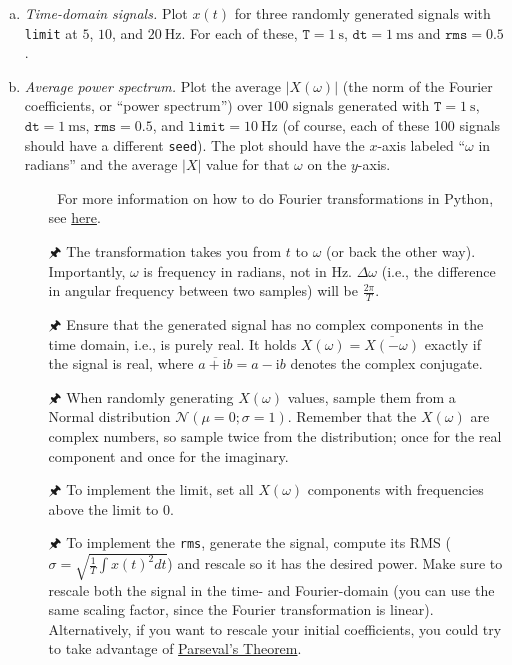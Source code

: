 	\begin{enumerate}[a)]
		\item {} \textit{Time-domain signals.} Plot $x(t)$ for three randomly generated signals with \texttt{limit} at $5$, $10$, and $\SI{20}{\hertz}$. For each of these, $\mathtt{T}=\SI{1}{\second}$, $\mathtt{dt}=\SI{1}{\milli\second}$ and $\mathtt{rms}=0.5$.
		\item {} \textit{Average power spectrum.} Plot the average $|X(\omega)|$ (the norm of the Fourier coefficients, or \enquote{power spectrum}) over $100$ signals generated with $\mathtt{T}=\SI{1}{\second}$, $\mathtt{dt}=\SI{1}{\milli\second}$, $\mathtt{rms}=0.5$, and $\mathtt{limit}=\SI{10}{\hertz}$ (of course, each of these 100 signals should have a different \texttt{seed}). The plot should have the $x$-axis labeled \enquote{$\omega$ in radians} and the average $|X|$ value for that $\omega$ on the $y$-axis.
		\begin{itemize}
			\item[{\symbolfont 🐍}] For more information on how to do Fourier transformations in Python, see \href{http://docs.scipy.org/doc/numpy/reference/routines.fft.html}{here}.
			\item[{\symbolfont 🖈}] The transformation takes you from $t$ to $\omega$ (or back the other way). Importantly, $\omega$ is frequency in radians, not in Hz. $\Delta \omega$ (i.e., the difference in angular frequency between two samples) will be $\frac{2\pi}T$.
			\item[{\symbolfont 🖈}] Ensure that the generated signal has no complex components in the time domain, i.e., is purely real. It holds $X(\omega)=\overline{X(-\omega)}$ exactly if the signal is real, where $\overline{a + \mathrm{i}b} = a - \mathrm{i}b$ denotes the complex conjugate.
			\item[{\symbolfont 🖈}] When randomly generating $X(\omega)$ values, sample them from a Normal distribution $\mathcal{N}(\mu=0; \sigma=1)$. Remember that the $X(\omega)$ are complex numbers, so sample twice from the distribution; once for the real component and once for the imaginary.
			\item[{\symbolfont 🖈}] To implement the limit, set all $X(\omega)$ components with frequencies above the limit to $0$.
			\item[{\symbolfont 🖈}] To implement the \texttt{rms}, generate the signal, compute its RMS ($\sigma = \sqrt{\frac{1}T \int{x(t)^2}dt}$) and rescale so it has the desired power. Make sure to rescale both the signal in the time- and Fourier-domain (you can use the same scaling factor, since the Fourier transformation is linear). Alternatively, if you want to rescale your initial coefficients, you could try to take advantage of \href{https://en.wikipedia.org/wiki/Parseval%27s_theorem#Notation_used_in_physics}{Parseval's Theorem}.
		\end{itemize}
	\end{enumerate}

